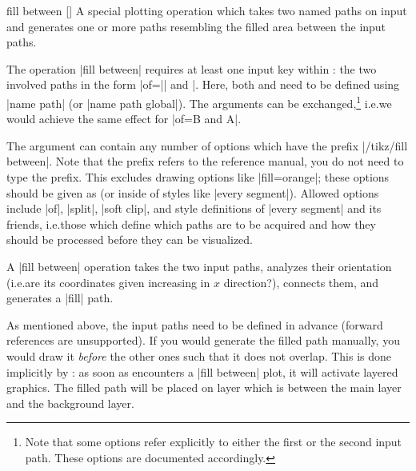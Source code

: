 \begin{addplotoperation}[]{fill between}{%
    []
}
    A special plotting operation which takes two named paths on input and
    generates one or more paths resembling the filled area between the input
    paths.
\begin{codeexample}[]
\end{codeexample}
    The operation |fill between| requires at least one input key within
    :
    the two involved paths in the form |of=|| and |.
    Here, both  and  need to be defined using
    |name path| (or |name path global|). The arguments can be
    exchanged,\footnote{Note that some options refer explicitly to either the
    first or the second input path. These options are documented accordingly.}
    i.e.\@ we would achieve the same effect for |of=B and A|.

    The argument  can contain any number of options
    which have the prefix |/tikz/fill between|. Note that the prefix refers to
    the reference manual, you do not need to type the prefix. This excludes
    drawing options like |fill=orange|; these options should be given as
     (or inside of styles like |every segment|). Allowed options
    include |of|, |split|, |soft clip|, and style definitions of
    |every segment| and its friends, i.e.\@ those which define which paths are
    to be acquired and how they should be processed before they can be
    visualized.

    A |fill between| operation takes the two input paths, analyzes their
    orientation (i.e.\@ are its coordinates given increasing in $x$
    direction?), connects them, and generates a |fill| path.

    As mentioned above, the input paths need to be defined in advance (forward
    references are unsupported). If you would generate the filled path
    manually, you would draw it \emph{before} the other ones such that it does
    not overlap. This is done implicitly by \PGFPlots{}: as soon as \PGFPlots{}
    encounters a |fill between| plot, it will activate layered graphics. The
    filled path will be placed on layer  which is
    between the main layer and the background layer.\label{Layer!pre main}


\end{addplotoperation}
